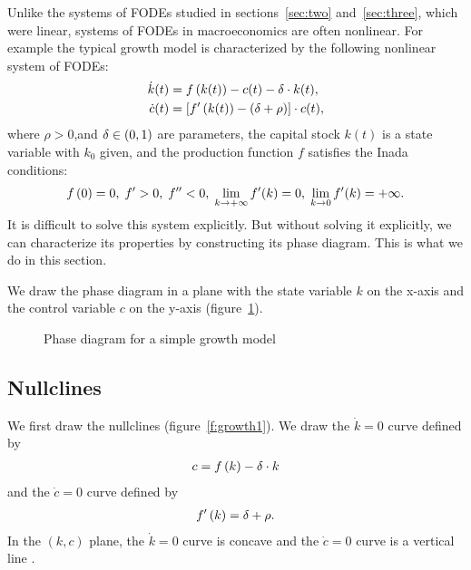 \documentclass[letterpaper,12pt,leqno]{article}
\newcommand{\pdf}{phasediagrams.pdf}
\begin{document}
Unlike the systems of FODEs studied in sections~\ref{sec:two} and~\ref{sec:three}, which were linear, systems of FODEs in macroeconomics are often nonlinear. For example the typical growth model is characterized by the following nonlinear system of FODEs:
\begin{align}
\dot{k}(t) &=f\left( k(t) \right) -c(t)-\delta \cdot k(t),  \label{eq:growth1} \\
\dot{c}(t) &=\left[ f'\left( k(t) \right) -\left( \delta+\rho \right) \right]\cdot c(t), \label{eq:growth2}
\end{align}
where $\rho >0$,and $\delta \in \left( 0,1 \right)$ are parameters, the capital stock $k(t)$ is a state variable
with $k_{0}$ given, and the production function $f$ satisfies the Inada conditions:
\begin{align*}
f\left( 0 \right)=0,\; f'>0,\;f''<0,\;\lim_{k\to +\infty}f'(k)=0,\;\lim_{k\to 0}f'(k) =+\infty.
\end{align*}
It is difficult to solve this system explicitly. But without solving it explicitly, we can characterize its properties by constructing its phase diagram. This is what we do in this section.

We draw the phase diagram in a plane with the state variable $k$ on the x-axis and the control variable $c$ on the y-axis (figure~\ref{f:growth}).


\begin{figure}[p]
\hfill
{}\vfig
{}\hfill
{}
\caption{Phase diagram for a simple growth model}
\label{f:growth}\end{figure}

\subsection{Nullclines}

We first draw the nullclines (figure~\ref{f:growth1}). We draw the $\dot{k}=0$ curve defined by
\begin{align*}
c=f\left( k \right) -\delta\cdot k
\end{align*}
and the $\dot{c}=0$ curve defined by
\begin{align*}
f^{\prime}\left( k \right) =\delta +\rho.
\end{align*}
In the $(k,c)$ plane, the $\dot{k}=0$ curve is concave and the $\dot{c}=0$ curve is a vertical line .
\end{document}

